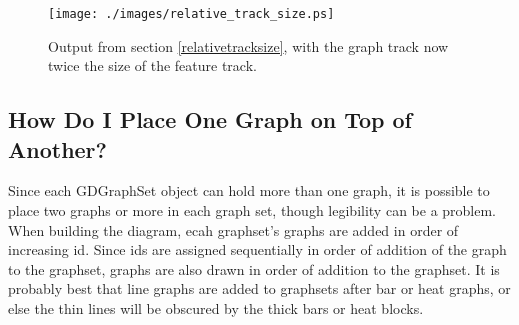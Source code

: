 \documentclass{article}
\begin{document}
\begin{figure}[hptb]
  \texttt{[image: ./images/relative\_track\_size.ps]}\\
  \caption{Output from section \ref{relativetracksize}, with the graph track 
now twice the size of the feature track.}
\label{relativetracksizefig}
\end{figure}

\subsection{How Do I Place One Graph on Top of Another?}\label{twographs}
Since each GDGraphSet object can hold more than one graph, it is possible to 
place two graphs or more in each graph set, though legibility can be a 
problem.  When building the diagram, ecah graphset's graphs are added in 
order of increasing id.  Since ids are assigned sequentially in order of 
addition of the graph to the graphset, graphs are also drawn in order of 
addition to the graphset.  It is probably best that line graphs are added 
to graphsets after bar or heat graphs, or else the thin lines will be 
obscured by the thick bars or heat blocks.
\end{document}
